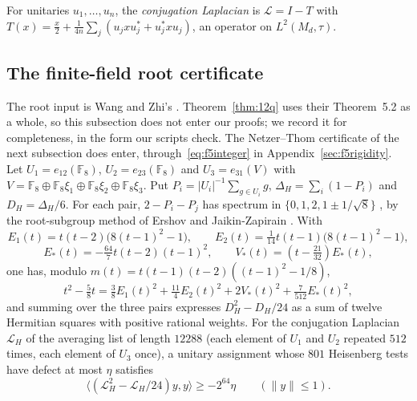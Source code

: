 \documentclass[11pt]{article}
\begin{document}
For unitaries $u_1,\dots,u_n$, the \emph{conjugation Laplacian} is $\mathcal L=I-T$ with $T(x)=\frac x2+\frac1{4n}\sum_j(u_jxu_j^*+u_j^*xu_j)$, an operator on $L^2(M_d,\tau)$.

\subsection*{The finite-field root certificate}
The root input is Wang and Zhi's \cite[Propositions~3.1 and~3.2]{WangZhi26}.  Theorem~\ref{thm:12q} uses their Theorem~5.2 as a whole, so this subsection does not enter our proofs; we record it for completeness, in the form our scripts check.  The Netzer--Thom certificate of the next subsection does enter, through~\eqref{eq:f5integer} in Appendix~\ref{sec:f5rigidity}.  Let $U_1=e_{12}(\mathbb F_8)$, $U_2=e_{23}(\mathbb F_8)$ and $U_3=e_{31}(V)$ with $V=\mathbb F_8\oplus\mathbb F_8\xi_1\oplus\mathbb F_8\xi_2\oplus\mathbb F_8\xi_3$.  Put $P_i=|U_i|^{-1}\sum_{g\in U_i}g$, $\Delta_H=\sum_i(1-P_i)$ and $D_H=\Delta_H/6$.  For each pair, $2-P_i-P_j$ has spectrum in $\{0,1,2,1\pm1/\sqrt8\}$ \cite[(3.2)]{WangZhi26}, by the root-subgroup method of Ershov and Jaikin-Zapirain \cite{EJZ10}.  With
\[
 E_1(t)=t(t-2)\bigl(8(t-1)^2-1\bigr),\qquad E_2(t)=\tfrac1{14}t(t-1)\bigl(8(t-1)^2-1\bigr),
\]
\[
 E_*(t)=-\tfrac{64}7t(t-2)(t-1)^2,\qquad V_*(t)=(t-\tfrac{21}{32})E_*(t),
\]
one has, modulo $m(t)=t(t-1)(t-2)((t-1)^2-1/8)$,
\[
 t^2-\tfrac58t=\tfrac38E_1(t)^2+\tfrac{11}4E_2(t)^2+2V_*(t)^2+\tfrac7{512}E_*(t)^2,
\]
and summing over the three pairs expresses $D_H^2-D_H/24$ as a sum of twelve Hermitian squares with positive rational weights.  For the conjugation Laplacian $\mathcal L_H$ of the averaging list of length $12288$ (each element of $U_1$ and $U_2$ repeated $512$ times, each element of $U_3$ once), a unitary assignment whose $801$ Heisenberg tests have defect at most $\eta$ satisfies \cite[Proposition~3.2]{WangZhi26}
\begin{equation}\label{eq:root-residual}
 \langle(\mathcal L_H^2-\mathcal L_H/24)y,y\rangle\ge-2^{64}\eta\qquad(\|y\|\le1).
\end{equation}
\end{document}
